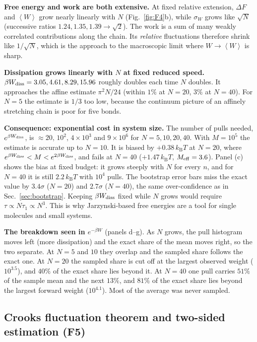 \documentclass[11pt,a4paper]{article}
\newcommand{\kT}{k_{\mathrm B}T}
\newcommand{\avg}[1]{\left\langle #1\right\rangle}
\newcommand{\Wd}{W_{\rm diss}}
\begin{document}
\noindent\textbf{Free energy and work are both extensive.} At fixed relative extension,
$\Delta F$ and $\avg W$ grow nearly linearly with $N$ (Fig.~\ref{fig:F4}b), while
$\sigma_W$ grows like $\sqrt N$ (successive ratios $1.24,1.35,1.39\to\sqrt2$). The work is a
sum of many weakly correlated contributions along the chain. Its \emph{relative} fluctuations
therefore shrink like $1/\sqrt N$, which is the approach to the macroscopic limit where
$W\to\avg W$ is sharp.

\noindent\textbf{Dissipation grows linearly with $N$ at fixed reduced speed.} $\beta\Wd=3.05,
4.61, 8.29, 15.96$ roughly doubles each time $N$ doubles. It approaches the affine estimate
$\pi^2N/24$ (within $1\%$ at $N=20$, $3\%$ at $N=40$). For $N=5$ the estimate is $1/3$ too low,
because the continuum picture of an affinely stretching chain is poor for five bonds.

\noindent\textbf{Consequence: exponential cost in system size.} The number of pulls needed,
$e^{\beta\Wd}$, is $\approx20$, $10^2$, $4\times10^3$ and $9\times10^6$ for $N=5,10,20,40$. With
$M=10^5$ the estimate is accurate up to $N=10$. It is biased by $+0.38\,\kT$ at $N=20$, where
$e^{\beta\Wd}<M<e^{2\beta\Wd}$, and fails at $N=40$ ($+1.47\,\kT$, $M_{\rm eff}=3.6$). Panel (c)
shows the bias at fixed budget: it grows steeply with $N$ for every $n$, and for $N=40$ it is
still $2.2\,\kT$ with $10^4$ pulls. The bootstrap error bars miss the exact value by $3.4\sigma$ ($N=20$) and
$2.7\sigma$ ($N=40$), the same over-confidence as in Sec.~\ref{sec:bootstrap}. Keeping
$\beta\Wd$ fixed while $N$ grows would require $\tau\propto N\tau_1\propto N^3$. This is why
Jarzynski-based free energies are a tool for single molecules and small systems.

\noindent\textbf{The breakdown seen in $e^{-\beta W}$} (panels d--g). As $N$ grows, the pull histogram
moves left (more dissipation) and the exact share of the mean moves right, so the two separate.
At $N=5$ and $10$ they overlap and the sampled share follows the exact one. At $N=20$ the sampled
share is cut off at the largest observed weight ($10^{3.5}$), and $40\%$ of the exact share lies beyond it.
At $N=40$ one pull carries $51\%$ of the sample mean and the next $13\%$, and $81\%$ of the exact share
lies beyond the largest forward weight ($10^{4.1}$). Most of the average was never sampled.

\subsection{Crooks fluctuation theorem and two-sided estimation (F5)}
\end{document}
